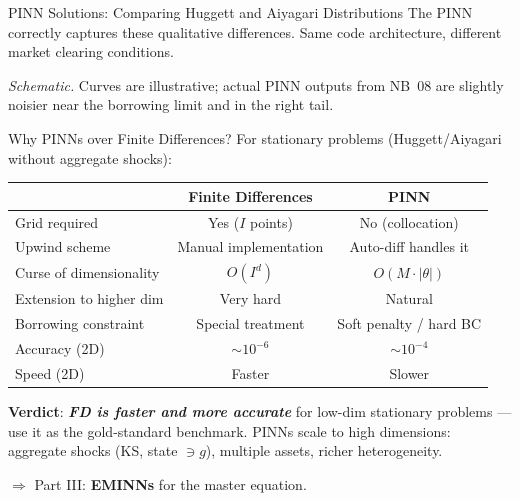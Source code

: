 \documentclass[aspectratio=169,11pt]{beamer}
\newcommand{\emphc}[1]{\textcolor{harvardcrimson}{#1}}
\begin{document}
\begin{frame}[shrink=2]{PINN Solutions: Comparing Huggett and Aiyagari Distributions}
\vspace{0.1em}
{\footnotesize The PINN correctly captures these qualitative differences. Same code architecture, different market clearing conditions.}

\vspace{0.05em}
{\scriptsize\emph{Schematic.}  Curves are illustrative; actual PINN outputs from NB~08 are slightly noisier near the borrowing limit and in the right tail.}
\end{frame}

\begin{frame}{Why PINNs over Finite Differences?}
\small
For stationary problems (Huggett/Aiyagari without aggregate shocks):

\vspace{0.1em}
\begin{center}
\footnotesize
\renewcommand{\arraystretch}{1.05}
\begin{tabular}{lcc}
\toprule
& \textbf{Finite Differences} & \textbf{PINN} \\
\midrule
Grid required & Yes ($I$ points) & \emphc{No} (collocation) \\
Upwind scheme & Manual implementation & Auto-diff handles it \\
Curse of dimensionality & $O(I^d)$ & $O(M \cdot |\theta|)$ \\
Extension to higher dim & Very hard & Natural \\
Borrowing constraint & Special treatment & Soft penalty / hard BC \\
Accuracy (2D) & $\sim 10^{-6}$ & $\sim 10^{-4}$ \\
Speed (2D) & Faster & Slower \\
\bottomrule
\end{tabular}
\end{center}

\vspace{0.1em}
\textbf{Verdict}: \textbf{\emph{FD is faster and more accurate}} for low-dim stationary problems --- use it as the gold-standard benchmark. PINNs \emphc{scale to high dimensions}: aggregate shocks (KS, state $\ni g$), multiple assets, richer heterogeneity.
\vspace{-0.2em}

$\Longrightarrow$ Part III: \textbf{EMINNs} for the master equation.
\end{frame}

\end{document}
